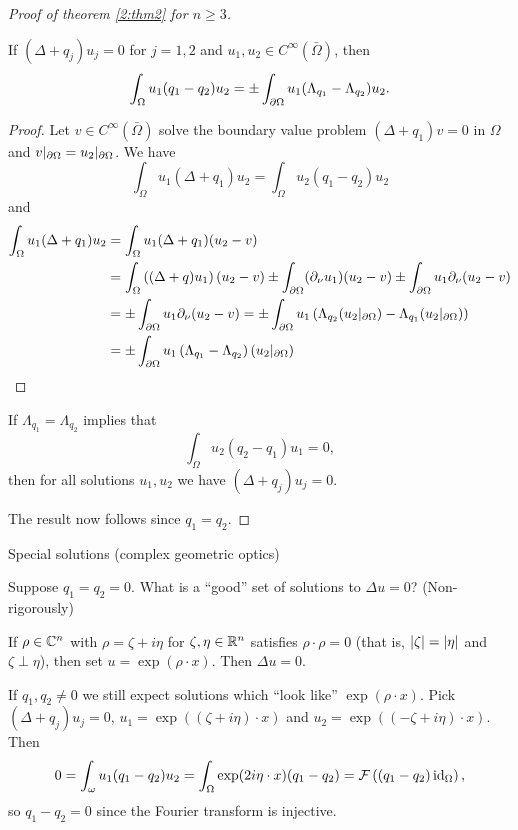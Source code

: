 \begin{proof}[Proof of theorem \ref{2:thm2} for $n \geq 3$]
  \begin{prop}
    If $(\Delta+q_j)u_j=0$ for $j=1,2$ and $u_1,u_2 \in C^\infty(\bar\Omega)$, then
    \[ \int_\Omega u_1(q_1-q_2)u_2 = \pm \int_{\partial\Omega} u_1(\Lambda_{q_1}-\Lambda_{q_2})u_2. \]
  \end{prop}

  \begin{proof}
    Let $v \in C^\infty(\bar\Omega)$ solve the boundary value problem $(\Delta+q_1)v=0$ in $\Omega$ and $v|_{\partial\Omega}=u_2|_{\partial\Omega}$.
    We have
    \[ \int_\Omega u_1(\Delta+q_1)u_2 = \int_\Omega u_2(q_1-q_2)u_2 \]
    and
    \begin{align*}
      \int_\Omega u_1(\Delta+q_1)u_2 &= \int_\Omega u_1(\Delta+q_1)(u_2-v) \\
      &= \int_\Omega \left( (\Delta+q)u_1 \right)(u_2-v) \pm \int_{\partial\Omega} (\partial_\nu u_1)(u_2-v) \pm \int_{\partial\Omega} u_1 \partial_\nu(u_2-v) \\
      &= \pm \int_{\partial\Omega} u_1 \partial_\nu (u_2-v) = \pm \int_{\partial\Omega} u_1\left( \Lambda_{q_2}(u_2|_{\partial\Omega}) - \Lambda_{q_1}(u_2|_{\partial\Omega}) \right) \\
      &= \pm \int_{\partial\Omega} u_1 \left( \Lambda_{q_1}-\Lambda_{q_2} \right)(u_2|_{\partial\Omega}) \qedhere
    \end{align*}
  \end{proof}

  \begin{cor}
    If $\Lambda_{q_1}=\Lambda_{q_2}$ implies that
    \[ \int_\Omega u_2(q_2-q_1)u_1=0, \]
    then for all solutions $u_1,u_2$ we have $(\Delta+q_j)u_j=0$.
  \end{cor}

  The result now follows since $q_1=q_2$.
\end{proof}

Special solutions (complex geometric optics)

Suppose $q_1=q_2=0$.
What is a ``good'' set of solutions to $\Delta u=0$?
(Non-rigorously)

If $\rho \in \mathbb{C}^n$ with $\rho=\zeta+i\eta$ for $\zeta,\eta \in \mathbb{R}^n$ satisfies $\rho \cdot \rho = 0$ (that is, $\left\lvert \zeta \right\rvert=\left\lvert \eta \right\rvert$ and $\zeta \perp \eta$), then set $u=\exp(\rho \cdot x)$.
Then $\Delta u=0$.

If $q_1,q_2 \neq 0$ we still expect solutions which ``look like'' $\exp(\rho \cdot x)$.
Pick $(\Delta+q_j)u_j=0$, $u_1=\exp\left( (\zeta+i\eta) \cdot x \right)$ and $u_2=\exp\left( (-\zeta+i\eta) \cdot x \right)$.
Then
\[ 0 = \int_\omega u_1(q_1-q_2)u_2 = \int_\Omega \exp(2i\eta \cdot x) (q_1-q_2) = \mathcal{F} \left( (q_1-q_2)\operatorname{id}_\Omega \right), \]
so $q_1-q_2=0$ since the Fourier transform is injective.
